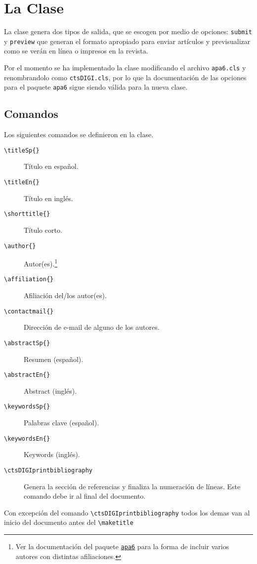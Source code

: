 \documentclass{article}
\begin{document}
\section{La Clase}
La clase genera dos tipos de salida, que se escogen por medio de opciones: \texttt{submit} y \texttt{preview} que generan el formato apropiado para enviar artículos y previsualizar como se verán en línea o impresos en la revista.

Por el momento se ha implementado la clase modificando el archivo \texttt{apa6.cls} y renombrandolo como \texttt{ctsDIGI.cls}, por lo que la documentación de las opciones para el paquete \texttt{apa6} sigue siendo válida para la nueva clase.

\subsection{Comandos}
Los siguientes comandos se definieron en la clase.
\begin{description}
\item [\texttt{\textbackslash titleSp\{\}}] Título en español.
\item [\texttt{\textbackslash titleEn\{\}}] Título en inglés.
\item [\texttt{\textbackslash shorttitle\{\}}] Título corto.
\item [\texttt{\textbackslash author\{\}}] Autor(es).\footnote{Ver la documentación del paquete \href{https://www.ctan.org/pkg/apa6}{\texttt{apa6}} para la forma de incluir varios autores con distintas afiliaciones.}
\item [\texttt{\textbackslash affiliation\{\}}] Afiliación del/los autor(es).\footnotemark[\value{footnote}]
\item [\texttt{\textbackslash contactmail\{\}}] Dirección de e-mail de alguno de los autores.
\item [\texttt{\textbackslash abstractSp\{\}}] Resumen (español).
\item [\texttt{\textbackslash abstractEn\{\}}] Abstract (inglés).
\item [\texttt{\textbackslash keywordsSp\{\}}] Palabras clave (español).
\item [\texttt{\textbackslash keywordsEn\{\}}] Keywords (inglés).
\item [\texttt{\textbackslash ctsDIGIprintbibliography}] Genera la sección de referencias y finaliza la numeración de líneas. Este comando debe ir al final del documento.
\end{description}
Con excepción del comando \texttt{\textbackslash ctsDIGIprintbibliography} todos los demas van al inicio del documento antes del \texttt{\textbackslash maketitle}
\end{document}
